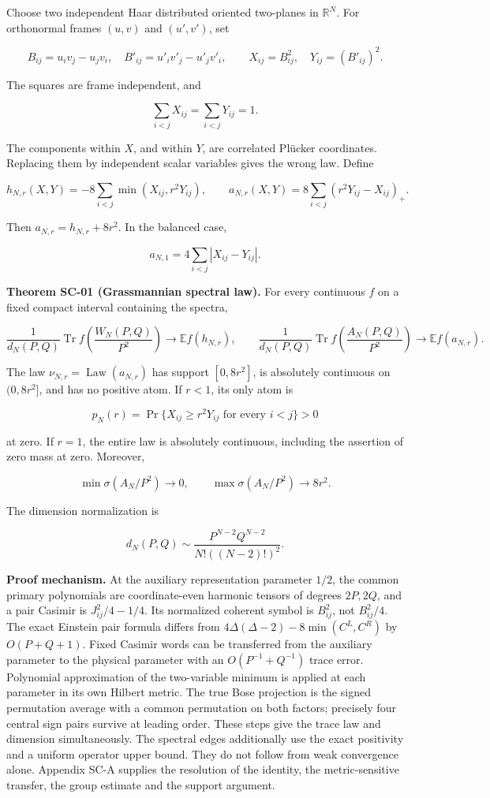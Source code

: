 \documentclass[a4paper,11pt]{article}
\numberwithin{equation}{section}
\begin{document}
Choose two independent Haar distributed oriented two-planes in \(\mathbb R^N\). For orthonormal frames \((u,v)\) and \((u',v')\), set

\[
B_{ij}=u_iv_j-u_jv_i,\quad B'_{ij}=u'_iv'_j-u'_jv'_i,
\qquad X_{ij}=B_{ij}^2,\quad Y_{ij}=(B'_{ij})^2.
\]

The squares are frame independent, and

\[
\sum_{i<j}X_{ij}=\sum_{i<j}Y_{ij}=1.
\]

The components within \(X\), and within \(Y\), are correlated Plücker coordinates. Replacing them by independent scalar variables gives the wrong law. Define

\[
h_{N,r}(X,Y)=-8\sum_{i<j}\min(X_{ij},r^2Y_{ij}),\qquad
a_{N,r}(X,Y)=8\sum_{i<j}(r^2Y_{ij}-X_{ij})_+.
\]

Then \(a_{N,r}=h_{N,r}+8r^2\). In the balanced case,

\[
a_{N,1}=4\sum_{i<j}|X_{ij}-Y_{ij}|.
\]

\textbf{Theorem SC-01 (Grassmannian spectral law).} For every continuous \(f\) on a fixed compact interval containing the spectra,

\[
\frac{1}{d_N(P,Q)}\operatorname{Tr}f\!\left(\frac{W_N(P,Q)}{P^2}\right)
\longrightarrow \mathbb E f(h_{N,r}),
\qquad
\frac{1}{d_N(P,Q)}\operatorname{Tr}f\!\left(\frac{A_N(P,Q)}{P^2}\right)
\longrightarrow \mathbb E f(a_{N,r}).
\]

The law \(\nu_{N,r}=\operatorname{Law}(a_{N,r})\) has support \([0,8r^2]\), is absolutely continuous on \((0,8r^2]\), and has no positive atom. If \(r<1\), its only atom is

\[
p_N(r)=\Pr\{X_{ij}\geq r^2Y_{ij}\text{ for every }i<j\}>0
\]

at zero. If \(r=1\), the entire law is absolutely continuous, including the assertion of zero mass at zero. Moreover,

\[
\min\sigma(A_N/P^2)\longrightarrow0,\qquad
\max\sigma(A_N/P^2)\longrightarrow8r^2.
\]

The dimension normalization is

\[
d_N(P,Q)\sim\frac{P^{N-2}Q^{N-2}}{N!((N-2)!)^2}.
\]

\textbf{Proof mechanism.} At the auxiliary representation parameter \(1/2\), the common primary polynomials are coordinate-even harmonic tensors of degrees \(2P,2Q\), and a pair Casimir is \(J_{ij}^2/4-1/4\). Its normalized coherent symbol is \(B_{ij}^2\), not \(B_{ij}^2/4\). The exact Einstein pair formula differs from \(4\Delta(\Delta-2)-8\min(C^L,C^R)\) by \(O(P+Q+1)\). Fixed Casimir words can be transferred from the auxiliary parameter to the physical parameter with an \(O(P^{-1}+Q^{-1})\) trace error. Polynomial approximation of the two-variable minimum is applied at each parameter in its own Hilbert metric. The true Bose projection is the signed permutation average with a common permutation on both factors; precisely four central sign pairs survive at leading order. These steps give the trace law and dimension simultaneously. The spectral edges additionally use the exact positivity and a uniform operator upper bound. They do not follow from weak convergence alone. Appendix SC-A supplies the resolution of the identity, the metric-sensitive transfer, the group estimate and the support argument.
\end{document}
